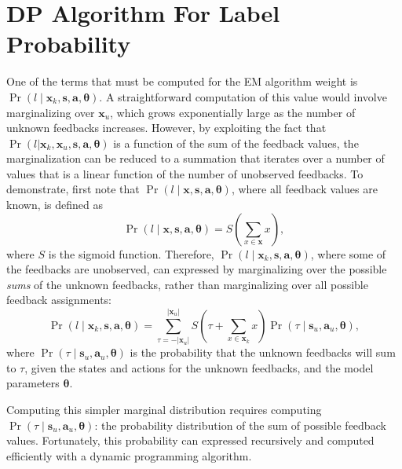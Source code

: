 
\section{DP Algorithm For Label Probability}

One of the terms that must be computed for the EM algorithm weight is $\Pr(l \mid \bm{x}_k, \bm{s}, \bm{a}, \bm{\theta})$. A straightforward computation of this value would involve marginalizing over $\bm{x}_u$, which grows exponentially large as the number of unknown feedbacks increases. However, by exploiting the fact that $\Pr(l | \bm{x}_k, \bm{x}_u, \bm{s}, \bm{a}, \bm{\theta})$ is a function of the sum of the feedback values, the marginalization can be reduced to a summation that iterates over a number of values that is a linear function of the number of unobserved feedbacks. To demonstrate, first note that $\Pr(l \mid \bm{x}, \bm{s}, \bm{a}, \bm{\theta})$, where all feedback values are known, is defined as
\begin{equation}
\Pr(l \mid \bm{x}, \bm{s}, \bm{a}, \bm{\theta}) = S\left(\sum_{x \in \bm{x}} x \right),
\end{equation} 
where $S$ is the sigmoid function. Therefore, $\Pr(l \mid \bm{x}_k, \bm{s}, \bm{a}, \bm{\theta})$, where some of the feedbacks are unobserved, can expressed by marginalizing over the possible {\em sums} of the unknown feedbacks, rather than marginalizing over all possible feedback assignments:
\begin{equation}
\Pr(l \mid \bm{x}_k, \bm{s}, \bm{a}, \bm{\theta}) = \sum_{\tau = -|\bm{x}_u|}^{|\bm{x}_u|} S\left(\tau + \sum_{x \in \bm{x}_k} x\right) \Pr(\tau \mid \bm{s}_u, \bm{a}_u, \bm{\theta}),
\end{equation}
where $\Pr(\tau \mid \bm{s}_u, \bm{a}_u, \bm{\theta})$ is the probability that the unknown feedbacks will sum to $\tau$, given the states and actions for the unknown feedbacks, and the model parameters $\bm{\theta}$.

Computing this simpler marginal distribution requires computing $\Pr(\tau \mid \bm{s}_u, \bm{a}_u, \bm{\theta})$: the probability distribution of the sum of possible feedback values. Fortunately, this probability can expressed recursively and computed efficiently with a dynamic programming algorithm. 

